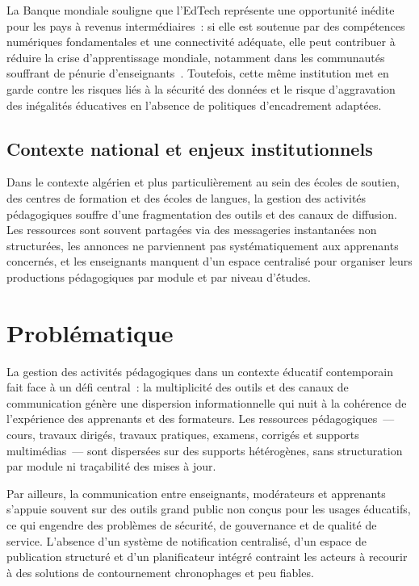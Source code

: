 \documentclass[12pt,a4paper,oneside]{report}
\begin{document}
La Banque mondiale souligne que l'EdTech repr\'esente une opportunit\'e in\'edite pour les pays \`a revenus interm\'ediaires~: si elle est soutenue par des comp\'etences num\'eriques fondamentales et une connectivit\'e ad\'equate, elle peut contribuer \`a r\'eduire la crise d'apprentissage mondiale, notamment dans les communaut\'es souffrant de p\'enurie d'enseignants~\cite{worldbank_edtech_2026}. Toutefois, cette m\^eme institution met en garde contre les risques li\'es \`a la s\'ecurit\'e des donn\'ees et le risque d'aggravation des in\'egalit\'es \'educatives en l'absence de politiques d'encadrement adapt\'ees.

\subsection{Contexte national et enjeux institutionnels}

Dans le contexte alg\'erien et plus particuli\`erement au sein des écoles de soutien, des centres de formation et des écoles de langues, la gestion des activit\'es p\'edagogiques souffre d'une fragmentation des outils et des canaux de diffusion. Les ressources sont souvent partag\'ees via des messageries instantan\'ees non structur\'ees, les annonces ne parviennent pas syst\'ematiquement aux apprenants concern\'es, et les enseignants manquent d'un espace centralis\'e pour organiser leurs productions p\'edagogiques par module et par niveau d'\'études.

\section{Probl\'ematique}
\label{sec:problematique}

La gestion des activit\'es p\'edagogiques dans un contexte éducatif contemporain fait face \`a un d\'efi central~: la multiplicit\'e des outils et des canaux de communication g\'en\`ere une dispersion informationnelle qui nuit \`a la coh\'erence de l'exp\'erience des apprenants et des formateurs. Les ressources p\'edagogiques~--- cours, travaux dirig\'es, travaux pratiques, examens, corrig\'es et supports multim\'edias~--- sont dispers\'ees sur des supports h\'et\'erog\`enes, sans structuration par module ni tra\c{c}abilit\'e des mises \`a jour.

Par ailleurs, la communication entre enseignants, mod\'erateurs et apprenants s'appuie souvent sur des outils grand public non con\c{c}us pour les usages éducatifs, ce qui engendre des probl\`emes de s\'ecurit\'e, de gouvernance et de qualit\'e de service. L'absence d'un syst\`eme de notification centralis\'e, d'un espace de publication structur\'e et d'un planificateur int\'egr\'e contraint les acteurs \`a recourir \`a des solutions de contournement chronophages et peu fiables.
\end{document}
